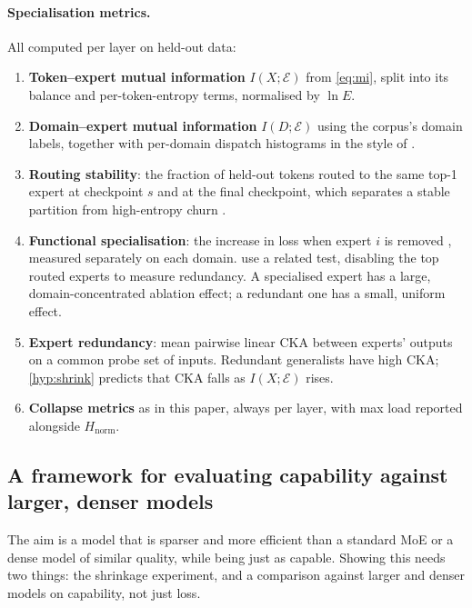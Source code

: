 \documentclass[10pt]{article}
\theoremstyle{definition}
\theoremstyle{remark}
\newcommand{\Hn}{H_{\mathrm{norm}}}
\begin{document}
\paragraph{Specialisation metrics.} All computed per layer on held-out data:
\begin{enumerate}
  \item \textbf{Token--expert mutual information} $I(X;\mathcal{E})$ from \eqref{eq:mi}, split into its balance and per-token-entropy terms, normalised by $\ln E$.
  \item \textbf{Domain--expert mutual information} $I(D;\mathcal{E})$ \citep{gu2025elasticmoe} using the corpus's domain labels, together with per-domain dispatch histograms in the style of \citet{muennighoff2025olmoe}.
  \item \textbf{Routing stability}: the fraction of held-out tokens routed to the same top-1 expert at checkpoint $s$ and at the final checkpoint, which separates a stable partition from high-entropy churn \citep{dai2022stablemoe}.
  \item \textbf{Functional specialisation}: the increase in loss when expert $i$ is removed \citep{engmann2026causal}, measured separately on each domain. \citet{dai2024deepseekmoe} use a related test, disabling the top routed experts to measure redundancy. A specialised expert has a large, domain-concentrated ablation effect; a redundant one has a small, uniform effect.
  \item \textbf{Expert redundancy}: mean pairwise linear CKA \citep{kornblith2019similarity} between experts' outputs on a common probe set of inputs. Redundant generalists have high CKA; \cref{hyp:shrink} predicts that CKA falls as $I(X;\mathcal{E})$ rises.
  \item \textbf{Collapse metrics} as in this paper, always per layer, with max load reported alongside $\Hn$.
\end{enumerate}

\subsection{A framework for evaluating capability against larger, denser models}
\label{sec:capability}
The aim is a model that is sparser and more efficient than a standard MoE or a dense model of similar quality, while being just as capable. Showing this needs two things: the shrinkage experiment, and a comparison against larger and denser models on capability, not just loss.
\end{document}
